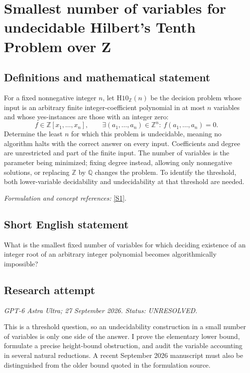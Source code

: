 \documentclass[11pt]{article}
\begin{document}
\section*{\texorpdfstring{Smallest number of variables for undecidable Hilbert's Tenth Problem over Z}{Smallest number of variables for undecidable Hilbert's Tenth Problem over Z}}\label{416}
\subsection{Definitions and mathematical statement}
For a fixed nonnegative integer $n$, let $\mathrm{H10}_{{\mathbb{Z}}}(n)$ be the decision problem whose input is an arbitrary finite integer-coefficient polynomial in at most $n$ variables and whose yes-instances are those with an integer zero:
\[
 f\in{\mathbb{Z}}[x_1,\ldots,x_n],\qquad
 \exists (a_1,\ldots,a_n)\in{\mathbb{Z}}^n:\ f(a_1,\ldots,a_n)=0.
\]
Determine the least $n$ for which this problem is undecidable, meaning no algorithm halts with the correct answer on every input. Coefficients and degree are unrestricted and part of the finite input. The number of variables is the parameter being minimized; fixing degree instead, allowing only nonnegative solutions, or replacing ${\mathbb{Z}}$ by ${\mathbb{Q}}$ changes the problem. To identify the threshold, both lower-variable decidability and undecidability at that threshold are needed.
\par\smallskip\textit{Formulation and concept references:} \href{https://www.cs.umd.edu/users/gasarch/open/hilbert10openproblems.pdf}{[S1]}.

\subsection{Short English statement}
What is the smallest fixed number of variables for which deciding existence of an integer root of an arbitrary integer polynomial becomes algorithmically impossible?
\subsection{Research attempt}
\textit{GPT-6 Astra Ultra; 27 September 2026. Status: UNRESOLVED.}

This is a threshold question, so an undecidability construction in a
small number of variables is only one side of the answer. I prove the
elementary lower bound, formulate a precise height-bound obstruction,
and audit the variable accounting in several natural reductions. A
recent September 2026 manuscript must also be distinguished from the
older bound quoted in the formulation source.
\end{document}
